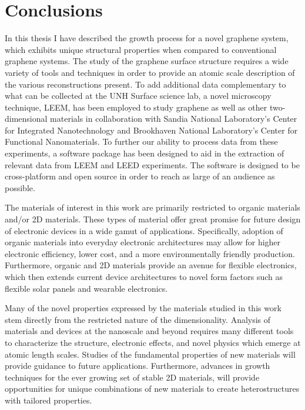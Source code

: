 \chapter{\sc Conclusions}
\label{ch:Conclusions}

In this thesis I have described the growth process for a novel graphene system, which exhibits unique structural properties when compared to conventional graphene systems. The study of the graphene surface structure requires a wide variety of tools and techniques in order to provide an atomic scale description of the various reconstructions present. To add additional data complementary to what can be collected at the UNH Surface science lab, a novel microscopy technique, LEEM, has been employed to study graphene as well as other two-dimensional materials in collaboration with Sandia National Laboratory's Center for Integrated Nanotechnology and Brookhaven National Laboratory's Center for Functional Nanomaterials. To further our ability to process data from these experiments, a software package has been designed to aid in the extraction of relevant data from LEEM and LEED experiments. The software is designed to be cross-platform and open source in order to reach as large of an audience as possible.

The materials of interest in this work are primarily restricted to organic materials and/or 2D materials. These types of material offer great promise for future design of electronic devices in a wide gamut of applications. Specifically, adoption of organic materials into everyday electronic architectures may allow for higher electronic efficiency, lower cost, and a more environmentally friendly production. Furthermore, organic and 2D materials provide an avenue for flexible electronics, which then extends current device architectures to novel form factors such as flexible solar panels and wearable electronics.

Many of the novel properties expressed by the materials studied in this work stem directly from the restricted nature of the dimensionality. Analysis of materials and devices at the nanoscale and beyond requires many different tools to characterize the structure, electronic effects, and novel physics which emerge at atomic length scales. Studies of the fundamental properties of new materials will provide guidance to future applications. Furthermore, advances in growth techniques for the ever growing set of stable 2D materials, will provide opportunities for unique combinations of new materials to create heterostructures with tailored properties.

